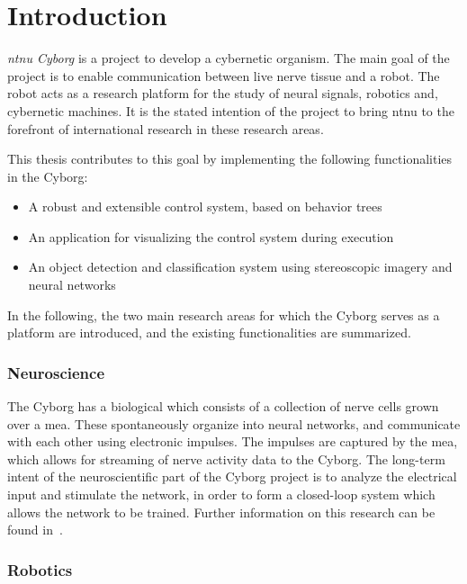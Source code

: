 \documentclass[\rootfolder/main.tex]{subfiles}
\begin{document}
\chapter{Introduction} %
\label{ch:introduction} %

\emph{\acrshort{ntnu} Cyborg} is a project to develop a cybernetic organism.
The main goal of the project is to enable communication between live nerve tissue and a robot.
The robot acts as a research platform for the study of neural signals, robotics and, cybernetic machines.
It is the stated intention of the project to bring \acrshort{ntnu} to the forefront of international research in these research areas.

This thesis contributes to this goal by implementing the following functionalities in the Cyborg:

\begin{itemize}
    \item A robust and extensible control system, based on behavior trees
    \item An application for visualizing the control system during execution
    \item An object detection and classification system using stereoscopic imagery and neural networks
\end{itemize}

In the following, the two main research areas for which the Cyborg serves as a platform are introduced, and the existing functionalities are summarized.

\subsection{Neuroscience}

The Cyborg has a biological  which consists of a collection of nerve cells grown over a \acrfull{mea}.
These spontaneously organize into neural networks, and communicate with each other using electronic impulses.
The impulses are captured by the \acrshort{mea}, which allows for streaming of nerve activity data to the Cyborg.
The long-term intent of the neuroscientific part of the Cyborg project is to analyze the electrical input and stimulate the network, in order to form a closed-loop system which allows the network to be trained.
Further information on this research can be found in~\cite{Knudsen2016}.

\subsection{Robotics}
\end{document}
